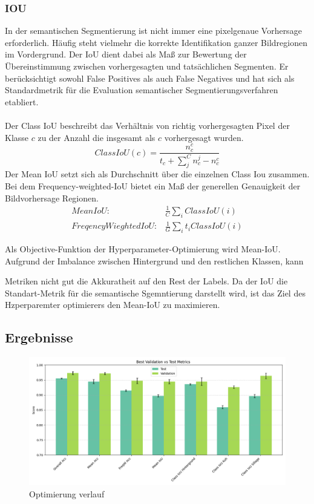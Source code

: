 \documentclass[12pt,DIV=15,BCOR=15mm,twoside,headsepline,abstract=true,listof=totoc,bibliography=totoc]{scrreprt}
\theoremstyle{remark}    %
\begin{document}
    \subsubsection{IOU}
    In der semantischen Segmentierung ist nicht immer eine pixelgenaue Vorhersage erforderlich. Häufig steht vielmehr die korrekte Identifikation ganzer 
    Bildregionen im Vordergrund. Der \ac{IoU} dient dabei als Maß zur Bewertung der Übereinstimmung zwischen vorhergesagten und tatsächlichen Segmenten. 
    Er berücksichtigt sowohl False Positives als auch False Negatives und hat sich als Standardmetrik für die Evaluation semantischer Segmentierungsverfahren 
    etabliert.\\\\ 
    Der Class \ac{IoU} beschreibt das Verhältnis von richtig vorhergesagten Pixel der Klasse $c$ zu der Anzahl die insgesamt als $c$ vorhergesagt wurden.
    \begin{equation}
        Class IoU(c) = \frac{n^c_{c}}{t_c + \sum_{j}^{C} n^j_{c} - n^c_{c}} 
    \end{equation}
    Der Mean \ac{IoU} setzt sich als Durchschnitt über die einzelnen Class Iou zusammen. Bei dem Frequency-weighted-\ac{IoU} bietet ein Maß der generellen Genauigkeit
    der Bildvorhersage Regionen.\cite{csurka2023semanticimagesegmentationdecades}
    \begin{align}
        Mean IoU:& \frac{1}{C} \sum_{i} Class IoU(i)\\
        Freqency Wieghted IoU: & \frac{1}{G} \sum_{i} t_i Class IoU(i)
    \end{align}\noindent

    Als Objective-Funktion der Hyperparameter-Optimierung wird Mean-\ac{IoU}. Aufgrund der Imbalance zwischen Hintergrund und den restlichen Klassen, kann 
    
    
    Metriken nicht gut die Akkuratheit auf den Rest der Labels. Da der \ac{IoU} die Standart-Metrik für die semantische Sgemntierung darstellt wird, ist das 
    Ziel des Hzperparemter optimierers den Mean-\ac{IoU} zu maximieren.
   
    \subsection{Ergebnisse}
    \begin{figure}[ht]
        \centering
        \includegraphics[width=\linewidth]{pics/val_vs_test.png}
        \caption{Optimierung verlauf}
    \end{figure}
\end{document}
